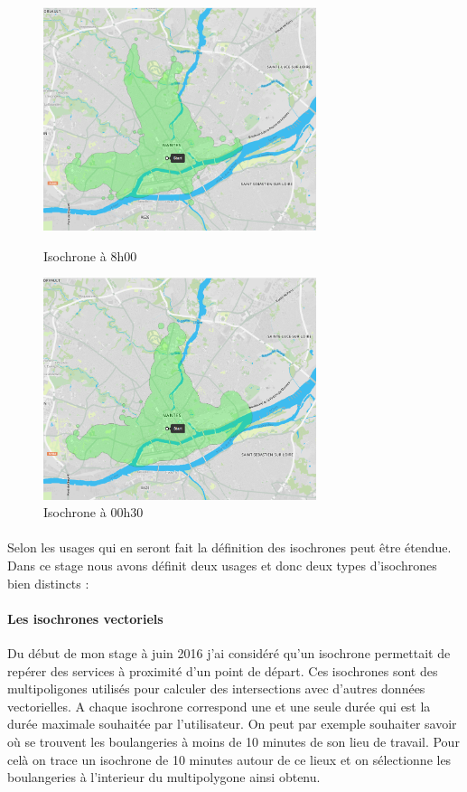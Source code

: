 \documentclass[a4paper]{report}
\begin{document}
\begin{figure}[H]
	\begin{minipage}[c]{.46\linewidth}
		\includegraphics[width=8cm]{image/iso_8h}
       		\caption{Isochrone à 8h00}
		\label{Isochrone à 8h00}
	\end{minipage} \hfill
	\begin{minipage}[c]{.46\linewidth}
		\includegraphics[width=8cm]{image/iso_00h30}
       		\caption{Isochrone à 00h30}
		\label{Isochrone à 00h30}
	\end{minipage}
\end{figure}

\paragraph{} Selon les usages qui en seront fait la définition des isochrones peut être étendue. Dans ce stage nous avons définit deux usages et donc deux types d'isochrones bien distincts : 

\paragraph{Les isochrones vectoriels} Du début de mon stage à juin 2016 j'ai considéré qu'un isochrone permettait de repérer des services à proximité d'un point de départ. Ces isochrones sont des multipoligones utilisés pour calculer des intersections avec d'autres données vectorielles. A chaque isochrone correspond une et une seule durée qui est la durée maximale souhaitée par l'utilisateur. On peut par exemple souhaiter savoir où se trouvent les boulangeries à moins de 10 minutes de son lieu de travail. Pour celà on trace un isochrone de 10 minutes autour de ce lieux et on sélectionne les boulangeries à l'interieur du multipolygone ainsi obtenu.
\end{document}
